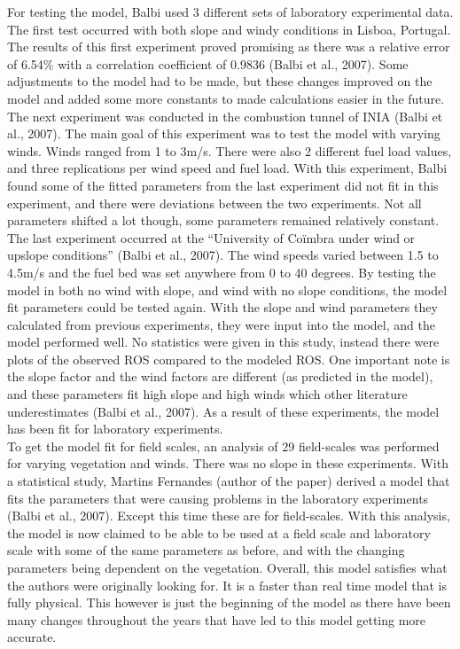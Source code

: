 \documentclass{article}
\begin{document}
\indent For testing the model, Balbi used 3 different sets of laboratory experimental data. The first test occurred with both slope and windy conditions in Lisboa, Portugal. The results of this first experiment proved promising as there was a relative error of 6.54\% with a correlation coefficient of 0.9836 (Balbi et al., 2007). Some adjustments to the model had to be made, but these changes improved on the model and added some more constants to made calculations easier in the future. The next experiment was conducted in the combustion tunnel of INIA (Balbi et al., 2007). The main goal of this experiment was to test the model with varying winds. Winds ranged from 1 to 3m/s. There were also 2 different fuel load values, and three replications per wind speed and fuel load. With this experiment, Balbi found some of the fitted parameters from the last experiment did not fit in this experiment, and there were deviations between the two experiments. Not all parameters shifted a lot though, some parameters remained relatively constant. The last experiment occurred at the “University of Coïmbra under wind or upslope conditions” (Balbi et al., 2007). The wind speeds varied between 1.5 to 4.5m/s and the fuel bed was set anywhere from 0 to 40 degrees. By testing the model in both no wind with slope, and wind with no slope conditions, the model fit parameters could be tested again. With the slope and wind parameters they calculated from previous experiments, they were input into the model, and the model performed well. No statistics were given in this study, instead there were plots of the observed ROS compared to the modeled ROS. One important note is the slope factor and the wind factors are different (as predicted in the model), and these parameters fit high slope and high winds which other literature underestimates (Balbi et al., 2007). As a result of these experiments, the model has been fit for laboratory experiments. \\
\indent To get the model fit for field scales, an analysis of 29 field-scales was performed for varying vegetation and winds. There was no slope in these experiments. With a statistical study, Martins Fernandes (author of the paper) derived a model that fits the parameters that were causing problems in the laboratory experiments (Balbi et al., 2007). Except this time these are for field-scales. With this analysis, the model is now claimed to be able to be used at a field scale and laboratory scale with some of the same parameters as before, and with the changing parameters being dependent on the vegetation. Overall, this model satisfies what the authors were originally looking for. It is a faster than real time model that is fully physical. This however is just the beginning of the model as there have been many changes throughout the years that have led to this model getting more accurate. \\
\end{document}

